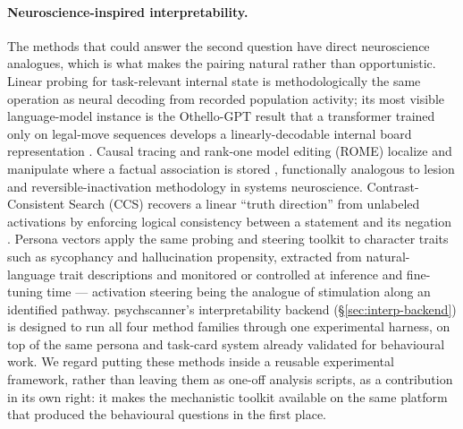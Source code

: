 \documentclass[11pt]{article}
\begin{document}
\paragraph{Neuroscience-inspired interpretability.} The methods that could
answer the second question have direct neuroscience analogues, which is
what makes the pairing natural rather than opportunistic. Linear probing
for task-relevant internal state is methodologically the same operation as
neural decoding from recorded population activity; its most visible
language-model instance is the Othello-GPT result that a transformer
trained only on legal-move sequences develops a linearly-decodable internal
board representation \citep{li2023othello}. Causal tracing and rank-one
model editing (ROME) localize and manipulate where a factual association is
stored \citep{meng2022rome}, functionally analogous to lesion and
reversible-inactivation methodology in systems neuroscience.
Contrast-Consistent Search (CCS) recovers a linear ``truth direction'' from
unlabeled activations by enforcing logical consistency between a statement
and its negation \citep{burns2023ccs}. Persona vectors
\citep{chen2025personavectors} apply the same probing and steering toolkit
to character traits such as sycophancy and hallucination propensity,
extracted from natural-language trait descriptions and monitored or
controlled at inference and fine-tuning time --- activation steering being
the analogue of stimulation along an identified pathway. psychscanner's
interpretability backend (\S\ref{sec:interp-backend}) is designed to run all
four method families through one experimental harness, on top of the same
persona and task-card system already validated for behavioural work. We
regard putting these methods inside a reusable experimental framework,
rather than leaving them as one-off analysis scripts, as a contribution in
its own right: it makes the mechanistic toolkit available on the same
platform that produced the behavioural questions in the first place.
\end{document}
